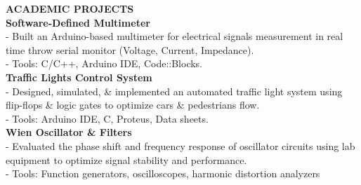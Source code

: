 \documentclass{article}
\begin{document}
\begin{minipage}[t]{0.66\textwidth}
\vspace{1.5em}
{\color{sectionteal}\large\bfseries ACADEMIC PROJECTS} \\[0.05em]
\textbf{Software-Defined Multimeter} \\
- Built an Arduino-based multimeter for electrical signals measurement in real time throw serial monitor (Voltage, Current, Impedance). \\[0.3em]
- Tools: C/C++, Arduino IDE, Code::Blocks. \\[0.3em]
\textbf{Traffic Lights Control System} \\
- Designed, simulated, \& implemented an automated traffic light system using flip-flops \& logic gates to optimize cars \& pedestrians flow. \\[0.3em]
- Tools: Arduino IDE, C, Proteus, Data sheets. \\[0.5em]
\textbf{Wien Oscillator \& Filters} \\
- Evaluated the phase shift and frequency response of oscillator circuits using lab equipment to optimize signal stability and performance. \\[0.3em]
- Tools: Function generators, oscilloscopes, harmonic distortion analyzers
\end{minipage}
\end{document}
